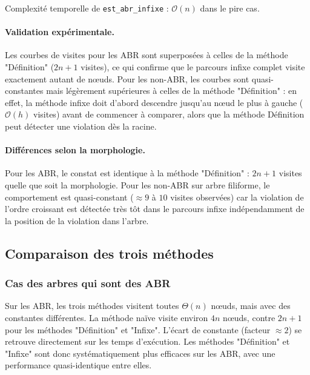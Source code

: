 \documentclass[12pt, a4paper]{article}
\begin{document}
\begin{resultatcle}
	Complexité temporelle de \texttt{est\_abr\_infixe} : $\mathcal{O}(n)$ dans le pire cas.
\end{resultatcle}

\paragraph{Validation expérimentale.}

Les courbes de visites pour les ABR sont superposées à celles de la méthode "Définition"
($2n+1$ visites), ce qui confirme que le parcours infixe complet visite exactement
autant de nœuds. Pour les non-ABR, les courbes sont quasi-constantes mais légèrement
supérieures à celles de la méthode "Définition" : en effet, la méthode infixe doit
d'abord descendre jusqu'au nœud le plus à gauche ($\mathcal{O}(h)$ visites) avant
de commencer à comparer, alors que la méthode Définition peut détecter une violation
dès la racine.

\paragraph{Différences selon la morphologie.}

Pour les ABR, le constat est identique à la méthode "Définition" : $2n+1$ visites
quelle que soit la morphologie. Pour les non-ABR sur arbre filiforme, le comportement
est quasi-constant ($\approx 9$ à $10$ visites observées) car la violation de l'ordre
croissant est détectée très tôt dans le parcours infixe indépendamment de la position
de la violation dans l'arbre.


\subsection{Comparaison des trois méthodes}

\subsubsection{Cas des arbres qui sont des ABR}

Sur les ABR, les trois méthodes visitent toutes $\Theta(n)$ nœuds, mais avec des
constantes différentes. La méthode naïve visite environ $4n$ nœuds, contre $2n+1$
pour les méthodes "Définition" et "Infixe". L'écart de constante (facteur $\approx 2$) se retrouve directement sur les temps d'exécution. Les méthodes "Définition" et "Infixe" sont donc systématiquement plus efficaces sur les ABR, avec une performance
quasi-identique entre elles.
\end{document}
